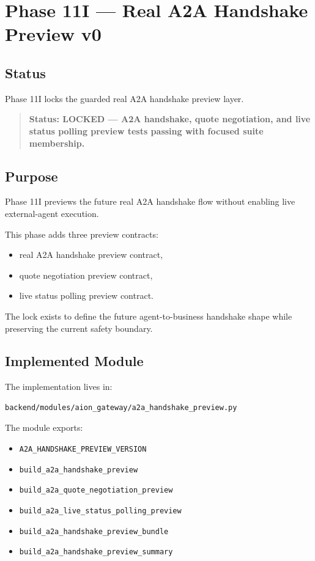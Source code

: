 \section{Phase 11I --- Real A2A Handshake Preview v0}
\label{sec:aion-a2a-handshake-preview-v0}

\subsection{Status}

Phase 11I locks the guarded real A2A handshake preview layer.

\begin{quote}
\textbf{Status: LOCKED --- A2A handshake, quote negotiation, and live status polling preview tests passing with focused suite membership.}
\end{quote}

\subsection{Purpose}

Phase 11I previews the future real A2A handshake flow without enabling live external-agent execution.

This phase adds three preview contracts:

\begin{itemize}
  \item real A2A handshake preview contract,
  \item quote negotiation preview contract,
  \item live status polling preview contract.
\end{itemize}

The lock exists to define the future agent-to-business handshake shape while preserving the current safety boundary.

\subsection{Implemented Module}

The implementation lives in:

\begin{verbatim}
backend/modules/aion_gateway/a2a_handshake_preview.py
\end{verbatim}

The module exports:

\begin{itemize}
  \item \texttt{A2A\_HANDSHAKE\_PREVIEW\_VERSION}
  \item \texttt{build\_a2a\_handshake\_preview}
  \item \texttt{build\_a2a\_quote\_negotiation\_preview}
  \item \texttt{build\_a2a\_live\_status\_polling\_preview}
  \item \texttt{build\_a2a\_handshake\_preview\_bundle}
  \item \texttt{build\_a2a\_handshake\_preview\_summary}
\end{itemize}

